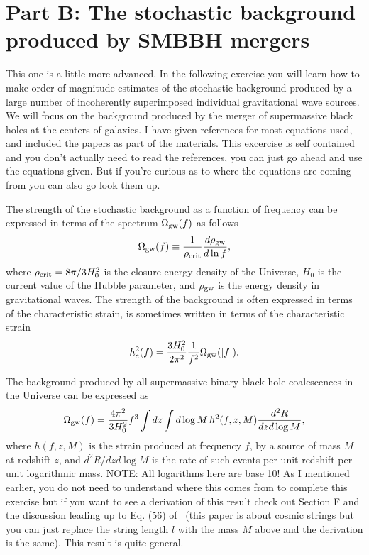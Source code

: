 \documentclass[prd,floatfix,preprintnumbers,amsmath,amssymb,nofootinbib,superscriptaddress]{revtex4}
\newcommand{\beq}{\begin{equation}}
\newcommand{\eeq}{\end{equation}}
\begin{document}
\pagebreak

\section*{Part B: The stochastic background produced by SMBBH mergers}

This one is a little more advanced. In the following exercise you will learn how to 
make order of magnitude estimates of the stochastic background produced by a large number of incoherently 
superimposed individual gravitational wave sources. We will focus on the background
produced by the merger of supermassive black holes at the centers of galaxies.  I have given references
for most equations used, and included the papers as part of the materials. This excercise is 
self contained and you don't actually need to read the references, you can just go ahead and 
use the equations given. But if you're curious as to 
where the equations are coming from you can also go look them up.

The strength of the stochastic background as a function of frequency can be expressed in terms of 
the spectrum $\Omega_{\rm gw}(f)$ as follows
\beq
 \Omega_{\rm gw}(f)\equiv \frac{1}{\rho_{\rm crit}}\frac{d\rho_{\rm gw}}{d\ln f},
\label{omdef}
\eeq
where $\rho_{\rm crit}=8\pi/3H_0^2$ is the closure energy density of the Universe, $H_0$ 
is the current value of the Hubble parameter, and $\rho_{\rm gw}$ is the energy 
density in gravitational waves.  The strength of the background is often expressed in terms
of the characteristic strain, is sometimes written in terms of the characteristic strain
\beq
h_c^2(f)=\frac{3H_0^2}{2\pi^2}\frac{1}{f^2}\Omega_{\rm gw}(|f|).
\eeq


The background produced by all supermassive binary black hole coalescences in the Universe 
can be expressed as
\begin{equation}
\Omega_{\rm gw}(f) = \frac{4 \pi^2}{3H^2_0}f^3 
\int dz \int d\log M \, h^2(f,z,M)  \frac {d^2R}{dzd\log M},
\label{e:Omega(f)2}
\end{equation}
where $h(f,z,M)$ is the strain produced at frequency $f$, by a source of 
mass $M$ at redshift $z$, and $d^2R/dzd\log M$ is 
the rate of such events per unit redshift per unit logarithmic mass. NOTE: All logarithms here are base 10!
As I mentioned earlier, you do not need to understand where this comes from to complete this exercise 
but if you want to see a derivation of this result check out Section F and the discussion 
leading up to Eq. (56) of~\cite{Leblond} (this paper is about cosmic strings but you can just replace the 
string length $l$ with the mass $M$ above and the derivation is the same). This result is quite general.
\end{document}
